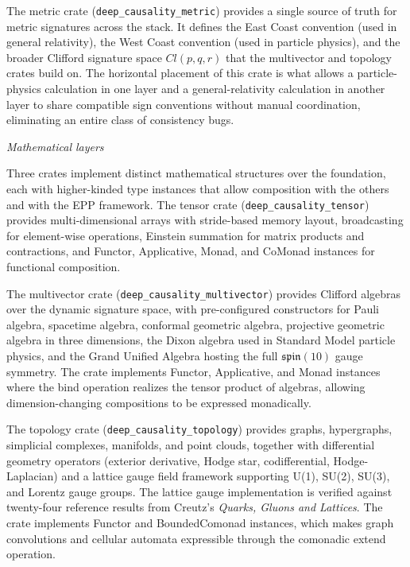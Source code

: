 The metric crate (\texttt{deep\_causality\_metric}) provides a single source of truth for metric signatures across the stack. It defines the East Coast convention (used in general relativity), the West Coast convention (used in particle physics), and the broader Clifford signature space $Cl(p, q, r)$ that the multivector and topology crates build on. The horizontal placement of this crate is what allows a particle-physics calculation in one layer and a general-relativity calculation in another layer to share compatible sign conventions without manual coordination, eliminating an entire class of consistency bugs.
 
\textit{Mathematical layers} 

Three crates implement distinct mathematical structures over the foundation, each with higher-kinded type instances that allow composition with the others and with the EPP framework. The tensor crate (\texttt{deep\_causality\_tensor}) provides multi-dimensional arrays with stride-based memory layout, broadcasting for element-wise operations, Einstein summation for matrix products and contractions, and Functor, Applicative, Monad, and CoMonad instances for functional composition. 

The multivector crate (\texttt{deep\_causality\_multivector}) provides Clifford algebras over the dynamic signature space, with pre-configured constructors for Pauli algebra, spacetime algebra, conformal geometric algebra, projective geometric algebra in three dimensions, the Dixon algebra used in Standard Model particle physics, and the Grand Unified Algebra hosting the full $\mathfrak{spin}(10)$ gauge symmetry. The crate implements Functor, Applicative, and Monad instances where the bind operation realizes the tensor product of algebras, allowing dimension-changing compositions to be expressed monadically. 

The topology crate (\texttt{deep\_causality\_topology}) provides graphs, hypergraphs, simplicial complexes, manifolds, and point clouds, together with differential geometry operators (exterior derivative, Hodge star, codifferential, Hodge-Laplacian) and a lattice gauge field framework supporting U(1), SU(2), SU(3), and Lorentz gauge groups. The lattice gauge implementation is verified against twenty-four reference results from Creutz's \emph{Quarks, Gluons and Lattices}\cite{creutz1983quarks}. The crate implements Functor and BoundedComonad instances, which makes graph convolutions and cellular automata expressible through the comonadic extend operation.
 
